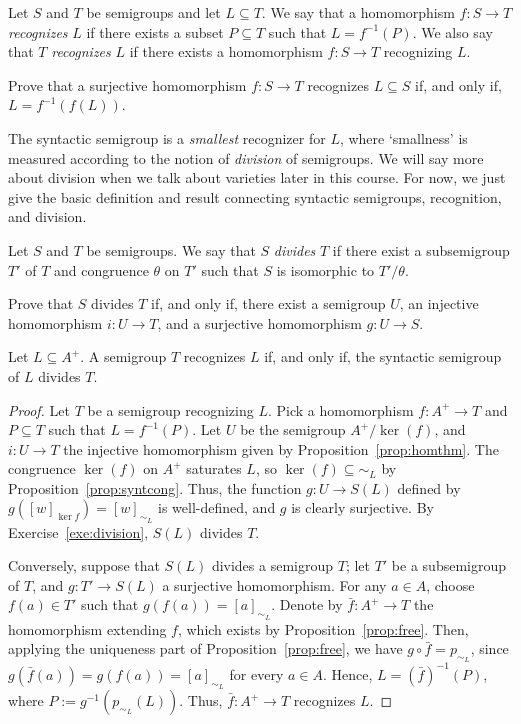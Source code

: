 \begin{definition}
Let $S$ and $T$ be semigroups and let $L \subseteq T$. We say that a homomorphism $f \colon S \to T$ \emph{recognizes} $L$ if there exists a subset $P \subseteq T$ such that $L = f^{-1}(P)$. We also say that $T$ \emph{recognizes} $L$ if there exists a homomorphism $f \colon S \to T$ recognizing $L$.
\end{definition}
\begin{exercise}\easy
  Prove that a surjective homomorphism $f \colon S \to T$ recognizes $L \subseteq S$ if, and only if, $L = f^{-1}(f(L))$.
\end{exercise}

The syntactic semigroup is a \emph{smallest} recognizer for $L$, where `smallness' is measured according to the notion of \emph{division} of semigroups. We will say more about division when we talk about varieties later in this course. For now, we just give the basic definition and result connecting syntactic semigroups, recognition, and division.
\begin{definition}
  Let $S$ and $T$ be semigroups. We say that $S$ \emph{divides} $T$ if there exist a subsemigroup $T'$ of $T$ and congruence $\theta$ on $T'$ such that $S$ is isomorphic to $T'/{\theta}$.
\end{definition}
\begin{exercise}\easy\label{exe:division}
Prove that $S$ divides $T$ if, and only if, there exist a semigroup $U$, an injective homomorphism $i \colon U \to T$, and a surjective homomorphism $g \colon U \to S$. 
\end{exercise}
\begin{proposition}
  Let $L \subseteq A^+$. A semigroup $T$ recognizes $L$ if, and only if, the syntactic semigroup of $L$ divides $T$.
\end{proposition}
\begin{proof}
  Let $T$ be a semigroup recognizing $L$. Pick a homomorphism $f \colon A^+ \to T$ and $P \subseteq T$ such that $L = f^{-1}(P)$. Let $U$ be the semigroup $A^+/{\ker(f)}$, and $i \colon U \to T$ the injective homomorphism given by Proposition~\ref{prop:homthm}. The congruence $\ker(f)$ on $A^+$ saturates $L$, so $\ker(f) \subseteq {\sim_L}$ by Proposition~\ref{prop:syntcong}. Thus, the function $g \colon U \to S(L)$ defined by $g([w]_{\ker{f}}) = [w]_{\sim_L}$ is well-defined, and $g$ is clearly surjective. By Exercise~\ref{exe:division}, $S(L)$ divides $T$.
 
  Conversely, suppose that $S(L)$ divides a semigroup $T$; let $T'$ be a subsemigroup of $T$,  and $g \colon T' \to S(L)$ a surjective homomorphism. For any $a \in A$, choose $f(a) \in T'$ such that $g(f(a)) = [a]_{\sim_L}$. Denote by $\bar{f} \colon A^+ \to T$ the homomorphism extending $f$, which exists by Proposition~\ref{prop:free}. Then, applying the uniqueness part of Proposition~\ref{prop:free}, we have $g \circ \bar{f} = p_{\sim_L}$, since $g(\bar{f}(a)) = g(f(a)) = [a]_{\sim_L}$ for every $a \in A$. Hence, $L = (\bar{f})^{-1}(P)$, where $P := g^{-1}(p_{\sim_L}(L))$. Thus, $\bar{f} \colon A^+ \to T$ recognizes $L$.
\end{proof}

